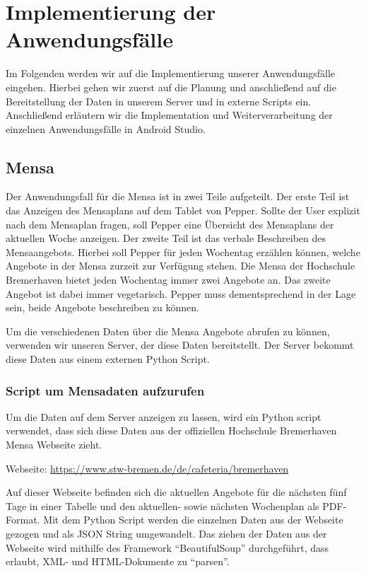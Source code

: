 \newcommand{\chapterpepperusecase}{Kapitel 6. }

\chapter{Implementierung der Anwendungsfälle}
\label{sec:Pepper_Anwendungsfälle}
\lhead{\chapterpepperusecase \emph{Pepper - Anwendungsfälle}}

Im Folgenden werden wir auf die Implementierung unserer Anwendungsfälle eingehen. Hierbei gehen wir zuerst auf die Planung und anschließend auf die Bereitstellung der Daten in unserem Server und in externe Scripts ein. Anschließend erläutern wir die Implementation und Weiterverarbeitung der einzelnen Anwendungsfälle in Android Studio.

\section{Mensa}

Der Anwendungsfall für die Mensa ist in zwei Teile aufgeteilt. Der erste Teil ist das Anzeigen des Mensaplans auf dem Tablet von Pepper. Sollte der User explizit nach dem Mensaplan fragen, soll Pepper eine Übersicht des Mensaplans der aktuellen Woche anzeigen. 
Der zweite Teil ist das verbale Beschreiben des Mensaangebots. Hierbei soll Pepper für jeden Wochentag erzählen können, welche Angebote in der Mensa zurzeit zur Verfügung stehen. Die Mensa der Hochschule Bremerhaven bietet jeden Wochentag immer zwei Angebote an. Das zweite Angebot ist dabei immer vegetarisch. Pepper muss dementsprechend in der Lage sein, beide Angebote beschreiben zu können. 

Um die verschiedenen Daten über die Mensa Angebote abrufen zu können, verwenden wir unseren Server, der diese Daten bereitstellt. Der Server bekommt diese Daten aus einem externen Python Script.

\subsection{Script um Mensadaten aufzurufen}

Um die Daten auf dem Server anzeigen zu lassen, wird ein Python script verwendet, dass sich diese Daten aus der offiziellen Hochschule Bremerhaven Mensa Webseite zieht. 

Webseite: \url{https://www.stw-bremen.de/de/cafeteria/bremerhaven}

Auf dieser Webseite befinden sich die aktuellen Angebote für die nächsten fünf Tage in einer Tabelle und den aktuellen- sowie nächsten Wochenplan als PDF-Format. Mit dem Python Script werden die einzelnen Daten aus der Webseite gezogen und als JSON String umgewandelt. Das ziehen der Daten aus der Webseite wird mithilfe des Framework ``BeautifulSoup'' durchgeführt, dass erlaubt, XML- und HTML-Dokumente zu ``parsen''.

